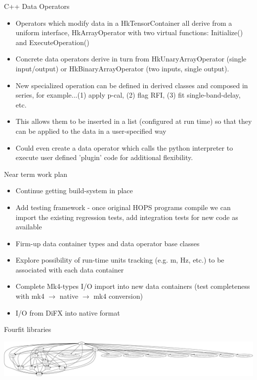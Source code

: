 \documentclass[xcolor=svgnames]{beamer}
\begin{document}
\begin{frame}{C++ Data Operators}

\begin{itemize}
\item Operators which modify data in a HkTensorContainer all derive from a uniform interface, HkArrayOperator with two virtual functions: Initialize() and ExecuteOperation()
\item Concrete data operators derive in turn from HkUnaryArrayOperator (single input/output) or HkBinaryArrayOperator (two inputs, single output).
\item New specialized operation can be defined in derived classes and composed in series, for example...(1) apply p-cal, (2) flag RFI, (3) fit single-band-delay, etc.
\item This allows them to be inserted in a list (configured at run time) so that they can be applied to the data in a user-specified way
\item Could even create a data operator which calls the python interpreter to execute user defined 'plugin' code for additional flexibility.
\end{itemize}

\end{frame}

\begin{frame}{Near term work plan}
 
 \begin{itemize}
  \item Continue getting build-system in place
  \item Add testing framework - once original HOPS programs compile we can import the existing regression tests, add integration tests for new code as available
  \item Firm-up data container types and data operator base classes
  \item Explore possibility of run-time units tracking (e.g. m, Hz, etc.) to be associated with each data container
  \item Complete Mk4-types I/O import into new data containers (test completeness with mk4 $\rightarrow$ native $\rightarrow$ mk4 conversion)
  \item I/O from DiFX into native format
 \end{itemize}

 
\end{frame}

\begin{frame}{Fourfit libraries}

\begin{center}
      \includegraphics[width=\textwidth]{fourfit.png}\\
\end{center}

\end{frame}
\end{document}
